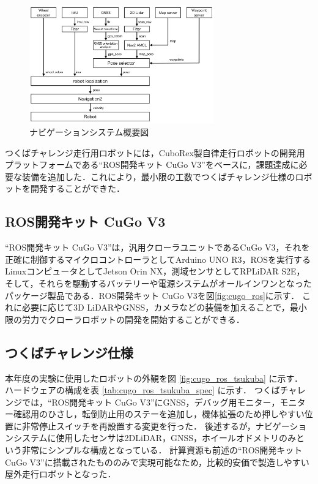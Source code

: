 \documentclass[platex,dvipdfmx]{rbproceedings}
\begin{document}
\begin{figure}[h]
    \centering   
    \includegraphics[keepaspectratio,width=80mm]{fig/system.png}
    \caption{ナビゲーションシステム概要図}
    \label{fig:system}
\end{figure}



つくばチャレンジ走行用ロボットには，CuboRex製自律走行ロボットの開発用プラットフォームである“ROS開発キット CuGo V3”をベースに，課題達成に必要な装備を追加した．これにより，最小限の工数でつくばチャレンジ仕様のロボットを開発することができた．

\subsection{ROS開発キット CuGo V3}
“ROS開発キット CuGo V3”は，汎用クローラユニットであるCuGo V3，それを正確に制御するマイクロコントローラとしてArduino UNO R3，ROSを実行するLinuxコンピュータとしてJetson Orin NX，測域センサとしてRPLiDAR S2E，そして，それらを駆動するバッテリーや電源システムがオールインワンとなったパッケージ製品である．ROS開発キット CuGo V3を図\ref{fig:cugo_ros}に示す．
これに必要に応じて3D LiDARやGNSS，カメラなどの装備を加えることで，最小限の労力でクローラロボットの開発を開始することができる．

\subsection{つくばチャレンジ仕様}
本年度の実験に使用したロボットの外観を図 \ref{fig:cugo_ros_tsukuba} に示す．
ハードウェアの構成を表 \ref{tab:cugo_ros_tsukuba_spec} に示す．
つくばチャレンジでは，“ROS開発キット CuGo V3”にGNSS，デバッグ用モニター，モニター確認用のひさし，転倒防止用のステーを追加し，機体拡張のため押しやすい位置に非常停止スイッチを再設置する変更を行った．
後述するが，ナビゲーションシステムに使用したセンサは2DLiDAR，GNSS，ホイールオドメトリのみという非常にシンプルな構成となっている．
計算資源も前述の“ROS開発キット CuGo V3”に搭載されたもののみで実現可能なため，比較的安価で製造しやすい屋外走行ロボットとなった．
\end{document}
